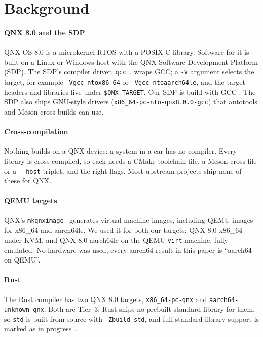 \documentclass[conference]{IEEEtran}
\begin{document}
\section{Background}\label{sec:background}

\paragraph{QNX 8.0 and the SDP} QNX OS 8.0 is a microkernel RTOS with a POSIX C library. Software for it is
built on a Linux or Windows host with the QNX Software Development Platform (SDP). The SDP's compiler driver,
\texttt{qcc}~\cite{qcc}, wraps GCC; a \texttt{-V} argument selects the target, for example
\texttt{-Vgcc\_ntox86\_64} or \texttt{-Vgcc\_ntoaarch64le}, and the target headers and libraries live under
\texttt{\$QNX\_TARGET}. Our SDP is build  with GCC . The SDP also ships GNU-style
drivers (\texttt{x86\_64-pc-nto-qnx8.0.0-gcc}) that autotools and Meson cross builds can use.

\paragraph{Cross-compilation} Nothing builds on a QNX device: a system in a car has no compiler. Every library is
cross-compiled, so each needs a CMake toolchain file, a Meson cross file or a \texttt{-{}-host} triplet, and the
right flags. Most upstream projects ship none of these for QNX.

\paragraph{QEMU targets} QNX's \texttt{mkqnximage}~\cite{mkqnximage} generates virtual-machine images, including
QEMU images for x86\_64 and aarch64le. We used it for both our targets: QNX 8.0 x86\_64 under KVM, and QNX 8.0
aarch64le on the QEMU \texttt{virt} machine, fully emulated. No hardware was used; every aarch64 result in this
paper is ``aarch64 on QEMU''.

\paragraph{Rust} The Rust compiler has two QNX 8.0 targets, \texttt{x86\_64-pc-qnx} and
\texttt{aarch64-unknown-qnx}. Both are Tier~3: Rust ships no prebuilt standard library for them, so
\texttt{std} is built from source with \texttt{-Zbuild-std}, and full standard-library support is marked as in
progress~\cite{rustqnx}.
\end{document}
